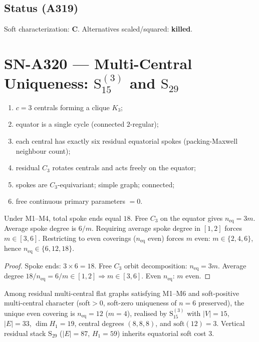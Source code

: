 \subsection*{Status (A319)}
Soft characterization: \textbf{C}. Alternatives scaled/squared: \textbf{killed}.

\section{SN-A320 --- Multi-Central Uniqueness: $\mathrm{S}_{15}^{(3)}$ and $\mathrm{S}_{29}$}
\label{sec:SN-A320}

\begin{definition}
\label{def:A320-M}
\begin{enumerate}[label=(M\arabic*)]
\item $c=3$ centrals forming a clique $K_3$;
\item equator is a single cycle (connected $2$-regular);
\item each central has exactly six residual equatorial spokes (packing-Maxwell neighbour count);
\item residual $C_3$ rotates centrals and acts freely on the equator;
\item spokes are $C_3$-equivariant; simple graph; connected;
\item free continuous primary parameters $=0$.
\end{enumerate}
\end{definition}

\begin{lemma}
\label{lem:A320-orb}
Under M1--M4, total spoke ends equal $18$. Free $C_3$ on the equator gives $n_{\mathrm{eq}}=3m$. Average spoke degree is $6/m$. Requiring average spoke degree in $[1,2]$ forces $m\in[3,6]$. Restricting to even coverings ($n_{\mathrm{eq}}$ even) forces $m$ even: $m\in\{2,4,6\}$, hence $n_{\mathrm{eq}}\in\{6,12,18\}$.
\end{lemma}

\begin{proof}
Spoke ends: $3\times 6=18$. Free $C_3$ orbit decomposition: $n_{\mathrm{eq}}=3m$. Average degree $18/n_{\mathrm{eq}}=6/m\in[1,2]\Rightarrow m\in[3,6]$. Even $n_{\mathrm{eq}}$: $m$ even.
\end{proof}

\begin{theorem}[Unique residual multi-central flat $n_{\mathrm{eq}}=12$]
\label{thm:A320}
Among residual multi-central flat graphs satisfying M1--M6 and soft-positive multi-central character (soft$>0$, soft-zero uniqueness of $n=6$ preserved), the unique even covering is $n_{\mathrm{eq}}=12$ ($m=4$), realised by $\mathrm{S}_{15}^{(3)}$ with $|V|=15$, $|E|=33$, $\dim H_1=19$, central degrees $(8,8,8)$, and $\mathrm{soft}(12)=3$. Vertical residual stack $\mathrm{S}_{29}$ ($|E|=87$, $H_1=59$) inherits equatorial soft cost $3$.
\end{theorem}

